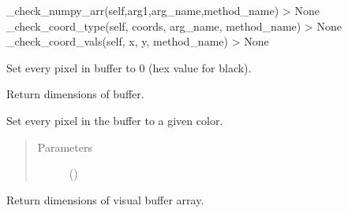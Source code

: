 \documentclass[letterpaper,10pt,english,openany,oneside]{sphinxmanual}
\begin{document}
\begin{fulllineitems}
\begin{fulllineitems}
\sphinxAtStartPar
\_check\_numpy\_arr(self,arg1,arg\_name,method\_name) \sphinxhyphen{}\textgreater{} None
\_check\_coord\_type(self, coords, arg\_name, method\_name) \sphinxhyphen{}\textgreater{} None
\_check\_coord\_vals(self, x, y, method\_name) \sphinxhyphen{}\textgreater{} None

\end{fulllineitems}



\begin{fulllineitems}
\sphinxAtStartPar
Set every pixel in buffer to 0 (hex value for black).

\end{fulllineitems}



\begin{fulllineitems}
\sphinxAtStartPar
Return dimensions of buffer.

\end{fulllineitems}



\begin{fulllineitems}
\sphinxAtStartPar
Set every pixel in the buffer to a given color.
\begin{quote}\begin{description}
\item[{Parameters}] \leavevmode
\sphinxAtStartPar
{} () \textendash{} 

\end{description}\end{quote}

\end{fulllineitems}



\begin{fulllineitems}
\sphinxAtStartPar
Return dimensions of visual buffer array.


\end{fulllineitems}
\end{fulllineitems}
\end{document}
